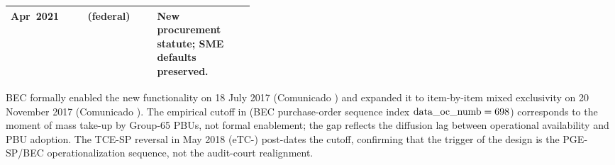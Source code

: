 \begin{table}[!htbp]
\begin{threeparttable}
\begin{tabular}{@{}l l p{0.40\linewidth}@{}}
Apr~2021  & \leiNova{} (federal)            & New procurement statute; SME defaults preserved. \\
\bottomrule
\end{tabular}
\begin{tablenotes}\footnotesize
\item[a] BEC formally enabled the new functionality on 18 July 2017 (Comunicado \comunicadoBECone) and expanded it to item-by-item mixed exclusivity on 20 November 2017 (Comunicado \comunicadoBECtwo). The empirical cutoff in \policyCutoffMonth{} (BEC purchase-order sequence index $\mathrm{data\_oc\_numb} = 698$) corresponds to the moment of mass take-up by Group-65 PBUs, not formal enablement; the gap reflects the diffusion lag between operational availability and PBU adoption. The TCE-SP reversal in May 2018 (eTC-\eTCExpansive) post-dates the cutoff, confirming that the trigger of the design is the PGE-SP/BEC operationalization sequence, not the audit-court realignment.
\end{tablenotes}
\end{threeparttable}
\end{table}
